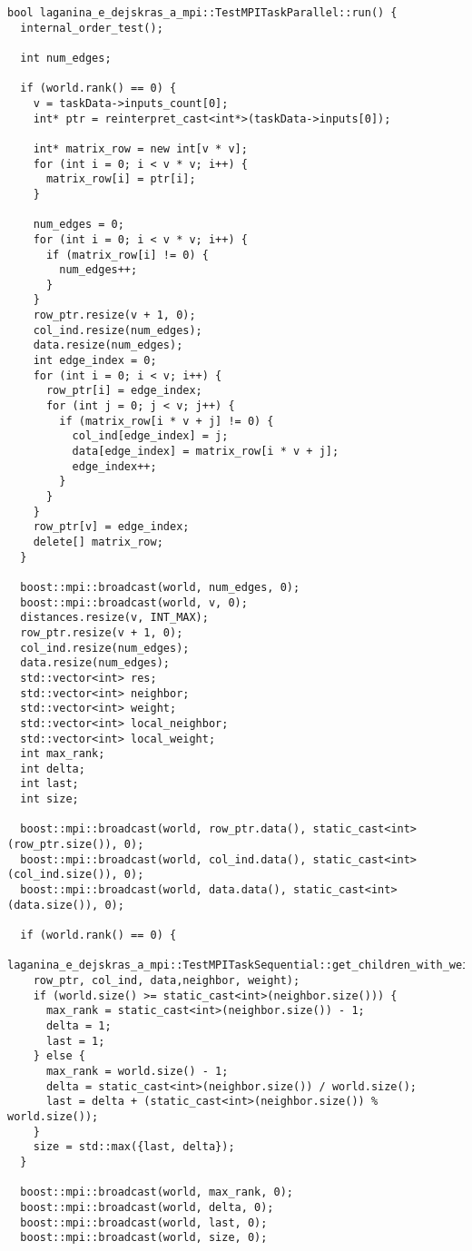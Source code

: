 \documentclass[12pt]{article}
\begin{document}
\begin{verbatim}
bool laganina_e_dejskras_a_mpi::TestMPITaskParallel::run() {
  internal_order_test();

  int num_edges;

  if (world.rank() == 0) {
    v = taskData->inputs_count[0];
    int* ptr = reinterpret_cast<int*>(taskData->inputs[0]);

    int* matrix_row = new int[v * v];
    for (int i = 0; i < v * v; i++) {
      matrix_row[i] = ptr[i];
    }

    num_edges = 0;
    for (int i = 0; i < v * v; i++) {
      if (matrix_row[i] != 0) {
        num_edges++;
      }
    }
    row_ptr.resize(v + 1, 0);
    col_ind.resize(num_edges);
    data.resize(num_edges);
    int edge_index = 0;
    for (int i = 0; i < v; i++) {
      row_ptr[i] = edge_index;
      for (int j = 0; j < v; j++) {
        if (matrix_row[i * v + j] != 0) {
          col_ind[edge_index] = j;
          data[edge_index] = matrix_row[i * v + j];
          edge_index++;
        }
      }
    }
    row_ptr[v] = edge_index;
    delete[] matrix_row;
  }

  boost::mpi::broadcast(world, num_edges, 0);
  boost::mpi::broadcast(world, v, 0);
  distances.resize(v, INT_MAX);
  row_ptr.resize(v + 1, 0);
  col_ind.resize(num_edges);
  data.resize(num_edges);
  std::vector<int> res;
  std::vector<int> neighbor;
  std::vector<int> weight;
  std::vector<int> local_neighbor;
  std::vector<int> local_weight;
  int max_rank;
  int delta;
  int last;
  int size;

  boost::mpi::broadcast(world, row_ptr.data(), static_cast<int>(row_ptr.size()), 0);
  boost::mpi::broadcast(world, col_ind.data(), static_cast<int>(col_ind.size()), 0);
  boost::mpi::broadcast(world, data.data(), static_cast<int>(data.size()), 0);

  if (world.rank() == 0) {
    laganina_e_dejskras_a_mpi::TestMPITaskSequential::get_children_with_weights(0, 
    row_ptr, col_ind, data,neighbor, weight);
    if (world.size() >= static_cast<int>(neighbor.size())) {
      max_rank = static_cast<int>(neighbor.size()) - 1;
      delta = 1;
      last = 1;
    } else {
      max_rank = world.size() - 1;
      delta = static_cast<int>(neighbor.size()) / world.size();
      last = delta + (static_cast<int>(neighbor.size()) % world.size());
    }
    size = std::max({last, delta});
  }

  boost::mpi::broadcast(world, max_rank, 0);
  boost::mpi::broadcast(world, delta, 0);
  boost::mpi::broadcast(world, last, 0);
  boost::mpi::broadcast(world, size, 0);


\end{verbatim}
\end{document}
